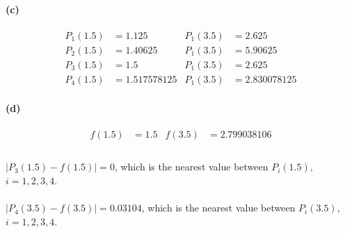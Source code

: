 \documentclass{article}  %
\begin{document}
        \paragraph{(c)}
        \begin{align*}
          P_1(1.5) &= 1.125 & P_1(3.5) &= 2.625\\
          P_2(1.5) &= 1.40625 & P_1(3.5) &= 5.90625\\
          P_3(1.5) &= 1.5 & P_1(3.5) &= 2.625\\
          P_4(1.5) &= 1.517578125 & P_1(3.5) &= 2.830078125
        \end{align*}
        \paragraph{(d)}
        \begin{align*}
          f(1.5) &= 1.5 & f(3.5) &= 2.799038106\\
        \end{align*}
        \paragraph{}$|P_3(1.5) - f(1.5)| = 0$, which is the nearest value between $P_i(1.5)$, $i = 1, 2, 3, 4$.
        \paragraph{}$|P_4(3.5) - f(3.5)| = 0.03104$, which is the nearest value between $P_i(3.5)$, $i = 1, 2, 3, 4$.
\end{document}
